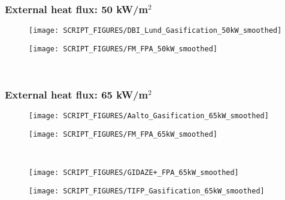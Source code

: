 \begin{landscape}
\subsubsection{External heat flux: 50 kW/m$^2$}
\begin{minipage}{0.65\textwidth}
\begin{figure}[H]
{\texttt{[image: SCRIPT\_FIGURES/DBI\_Lund\_Gasification\_50kW\_smoothed]}}\\
\end{figure}
\end{minipage}
\begin{minipage}{0.35\textwidth}
\begin{figure}[H]
{\texttt{[image: SCRIPT\_FIGURES/FM\_FPA\_50kW\_smoothed]}}\\
\end{figure}
\end{minipage}\\
\vfill
\newpage
\subsubsection{External heat flux: 65 kW/m$^2$}
\begin{minipage}{0.65\textwidth}
\begin{figure}[H]
{\texttt{[image: SCRIPT\_FIGURES/Aalto\_Gasification\_65kW\_smoothed]}}\\
\end{figure}
\end{minipage}
\begin{minipage}{0.35\textwidth}
\begin{figure}[H]
{\texttt{[image: SCRIPT\_FIGURES/FM\_FPA\_65kW\_smoothed]}}\\
\end{figure}
\end{minipage}\\
\begin{minipage}{0.65\textwidth}
\begin{figure}[H]
{\texttt{[image: SCRIPT\_FIGURES/GIDAZE+\_FPA\_65kW\_smoothed]}}\\
\end{figure}
\end{minipage}
\begin{minipage}{0.35\textwidth}
\begin{figure}[H]
{\texttt{[image: SCRIPT\_FIGURES/TIFP\_Gasification\_65kW\_smoothed]}}\\
\end{figure}
\end{minipage}\\


\end{landscape}
